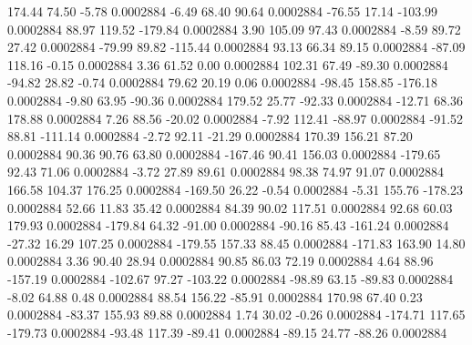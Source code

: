       174.44       74.50       -5.78     0.0002884
       -6.49       68.40       90.64     0.0002884
      -76.55       17.14     -103.99     0.0002884
       88.97      119.52     -179.84     0.0002884
        3.90      105.09       97.43     0.0002884
       -8.59       89.72       27.42     0.0002884
      -79.99       89.82     -115.44     0.0002884
       93.13       66.34       89.15     0.0002884
      -87.09      118.16       -0.15     0.0002884
        3.36       61.52        0.00     0.0002884
      102.31       67.49      -89.30     0.0002884
      -94.82       28.82       -0.74     0.0002884
       79.62       20.19        0.06     0.0002884
      -98.45      158.85     -176.18     0.0002884
       -9.80       63.95      -90.36     0.0002884
      179.52       25.77      -92.33     0.0002884
      -12.71       68.36      178.88     0.0002884
        7.26       88.56      -20.02     0.0002884
       -7.92      112.41      -88.97     0.0002884
      -91.52       88.81     -111.14     0.0002884
       -2.72       92.11      -21.29     0.0002884
      170.39      156.21       87.20     0.0002884
       90.36       90.76       63.80     0.0002884
     -167.46       90.41      156.03     0.0002884
     -179.65       92.43       71.06     0.0002884
       -3.72       27.89       89.61     0.0002884
       98.38       74.97       91.07     0.0002884
      166.58      104.37      176.25     0.0002884
     -169.50       26.22       -0.54     0.0002884
       -5.31      155.76     -178.23     0.0002884
       52.66       11.83       35.42     0.0002884
       84.39       90.02      117.51     0.0002884
       92.68       60.03      179.93     0.0002884
     -179.84       64.32      -91.00     0.0002884
      -90.16       85.43     -161.24     0.0002884
      -27.32       16.29      107.25     0.0002884
     -179.55      157.33       88.45     0.0002884
     -171.83      163.90       14.80     0.0002884
        3.36       90.40       28.94     0.0002884
       90.85       86.03       72.19     0.0002884
        4.64       88.96     -157.19     0.0002884
     -102.67       97.27     -103.22     0.0002884
      -98.89       63.15      -89.83     0.0002884
       -8.02       64.88        0.48     0.0002884
       88.54      156.22      -85.91     0.0002884
      170.98       67.40        0.23     0.0002884
      -83.37      155.93       89.88     0.0002884
        1.74       30.02       -0.26     0.0002884
     -174.71      117.65     -179.73     0.0002884
      -93.48      117.39      -89.41     0.0002884
      -89.15       24.77      -88.26     0.0002884
